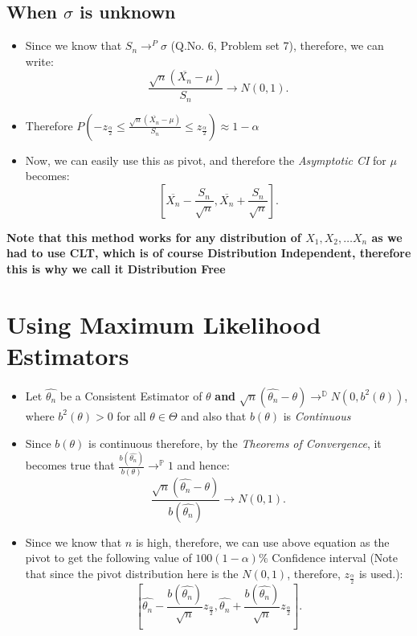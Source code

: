 \documentclass[a4paper]{article}
\begin{document}
\subsection{When $\sigma$ is unknown}

\begin{itemize}
	\item{Since we know that $S_n \to^{P} \sigma $ (Q.No. 6, Problem set 7), therefore, we can write: 
		\[
			\frac{\sqrt{n} \left( \overline{X_n}-\mu \right) }{S_n} \to N(0,1)
		.\] 	
		}

	\item{Therefore $P\left( -z_\frac{\alpha}{2} \le  \frac{\sqrt{n} \left(  \overline{X_n} - \mu  \right) }{S_n}   \le z_\frac{\alpha}{2} \right)   \approx 1- \alpha $	}

	\item{Now, we can easily use this as pivot, and therefore the \textit{Asymptotic CI} for $\mu$ becomes:
		\[
			\left[  \overline{X_n} - \frac{S_n}{\sqrt{n} }, \overline{X_n} + \frac{S_n}{\sqrt{n} }  \right] 
		.\] }
\end{itemize}

\textbf{Note that this method works for any distribution of $X_1, X_2, \ldots X_n$ as we had to use CLT, which is of course Distribution Independent, therefore this is why we call it Distribution Free}

\section{Using Maximum Likelihood Estimators}
\begin{itemize}
	\item {Let $\hat{\theta_n}$ be a Consistent Estimator of $\theta$ \textbf{and} $\sqrt{n}\left( \hat{\theta_n}-\theta \right)  \to^\mathbb{D} N(0,b^{2}(\theta)) $, where $b^2(\theta) > 0$ for all $\theta \in \Theta$ and also that $b(\theta)$ is \textit{Continuous} }

	\item{Since $b(\theta)$ is continuous therefore, by the \textit{Theorems of Convergence}, it becomes true that $\frac{b(\hat{\theta_n})}{b(\theta)} \to^{\mathbb{P} } 1 $ and hence:
		\[
			\frac{\sqrt{n} \left( \hat{\theta_n }- \theta \right) }{b(\hat{\theta_n})} \to N(0,1)		
		.\] }
	\item{Since we know that $n$ is high, therefore, we can use above equation as the pivot to get the following value of $100\left( 1-\alpha \right) \%$ Confidence interval (Note that since the pivot distribution here is the $N(0,1)$, therefore, $z_\frac{\alpha}{2}$ is used.):
			\[
				\left[ \hat{\theta_n} - \frac{b(\hat{\theta_n})}{\sqrt{n} }z_\frac{\alpha}{2}, \hat{\theta_n} + \frac{b(\hat{\theta_n})}{\sqrt{n} }z_\frac{\alpha}{2} \right] 
			.\] 
		}

\end{itemize}
\end{document}
